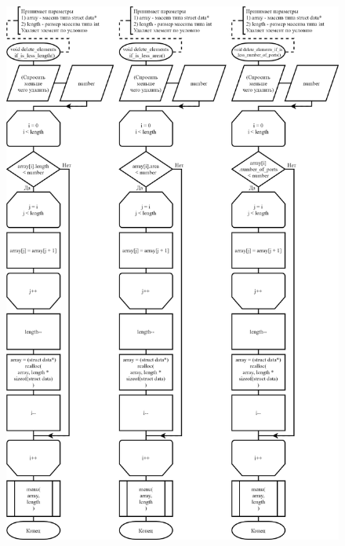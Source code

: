 \begin{figure}[!htp]
    \includegraphics[height=24cm]{../src/submenu/delete_by_condition/delete_by_condition-2.png}
\end{figure}
